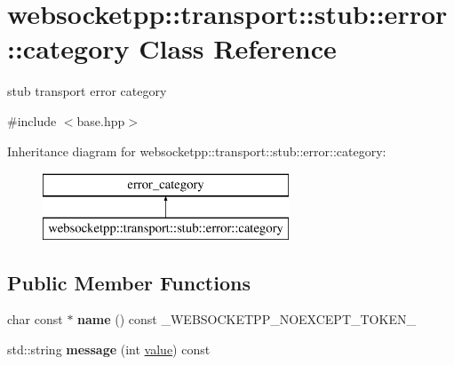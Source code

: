\hypertarget{classwebsocketpp_1_1transport_1_1stub_1_1error_1_1category}{}\section{websocketpp\+:\+:transport\+:\+:stub\+:\+:error\+:\+:category Class Reference}
\label{classwebsocketpp_1_1transport_1_1stub_1_1error_1_1category}


stub transport error category  




{\ttfamily \#include $<$base.\+hpp$>$}

Inheritance diagram for websocketpp\+:\+:transport\+:\+:stub\+:\+:error\+:\+:category\+:\begin{figure}[H]
\begin{center}
\leavevmode
\includegraphics[height=2.000000cm]{classwebsocketpp_1_1transport_1_1stub_1_1error_1_1category}
\end{center}
\end{figure}
\subsection*{Public Member Functions}
\begin{DoxyCompactItemize}
\item 
char const  $\ast$ {\bfseries name} () const \+\_\+\+W\+E\+B\+S\+O\+C\+K\+E\+T\+P\+P\+\_\+\+N\+O\+E\+X\+C\+E\+P\+T\+\_\+\+T\+O\+K\+E\+N\+\_\+\hypertarget{classwebsocketpp_1_1transport_1_1stub_1_1error_1_1category_a9ba015d3bbd5b18d1cf8d64cd0a60e31}{}\label{classwebsocketpp_1_1transport_1_1stub_1_1error_1_1category_a9ba015d3bbd5b18d1cf8d64cd0a60e31}

\item 
std\+::string {\bfseries message} (int \hyperlink{namespacewebsocketpp_1_1transport_1_1stub_1_1error_abff42d9e608f90864af8d628f6932022}{value}) const\hypertarget{classwebsocketpp_1_1transport_1_1stub_1_1error_1_1category_ae557fdbd7233cab11d84375f1e442618}{}\label{classwebsocketpp_1_1transport_1_1stub_1_1error_1_1category_ae557fdbd7233cab11d84375f1e442618}

\end{DoxyCompactItemize}


